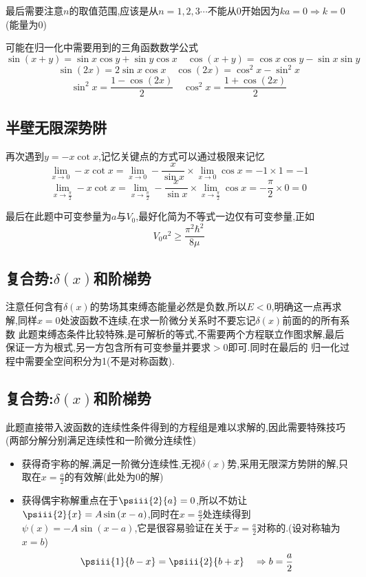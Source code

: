         最后需要注意$n$的取值范围,应该是从$n=1,2,3\cdots$不能从0开始因为$ka=0 \Rightarrow k=0$(能量为0)
        
        可能在归一化中需要用到的三角函数数学公式
        $$\sin(x+y)=\sin{x} \cos{y}+\sin{y}\cos{x} \quad \cos(x+y)=\cos{x} \cos{y} - \sin{x}\sin{y}$$ 
        $$\sin(2x) = 2\sin{x} \cos{x} \quad \cos(2x) = \cos^{2}{x} - \sin^{2}{x} $$
        $$\sin^{2}{x}=\frac{1-\cos(2x)}{2} \quad \cos^{2}{x}=\frac{1+\cos(2x)}{2} $$

    \subsection{半壁无限深势阱}
        再次遇到$y=-x \cot{x}$,记忆关键点的方式可以通过极限来记忆
        $$\lim_{x \to 0}- x \cot{x} = \lim_{x \to 0} -\frac{x}{\sin{x}} \times \lim_{x \to 0}\cos{x} = -1 \times 1 = -1  $$
        $$\lim_{x \to \frac{\pi}{2}}- x \cot{x} = \lim_{x \to \frac{\pi}{2}} -\frac{x}{\sin{x}} \times \lim_{x \to \frac{\pi}{2}}\cos{x} = -\frac{\pi}{2} \times 0 = 0  $$
        
        最后在此题中可变参量为$a$与$V_{0}$,最好化简为不等式一边仅有可变参量,正如
        $$V_{0}a^{2}\geq \frac{\pi^{2}\hbar^{2}}{8 \mu} $$

    \subsection{复合势:\texorpdfstring{$\delta(x)$}{}和阶梯势}
        注意任何含有$\delta(x)$的势场其束缚态能量必然是负数,所以$E<0$,明确这一点再求解,同样$x=0$处波函数不连续,在求一阶微分关系时不要忘记$\delta(x)$前面的的所有系数
        此题束缚态条件比较特殊,是可解析的等式,不需要两个方程联立作图求解,最后保证一方为根式,另一方包含所有可变参量并要求$>0$即可.同时在最后的
        归一化过程中需要全空间积分为1(不是对称函数).

    \subsection{复合势:\texorpdfstring{$\delta(x)$}{}和阶梯势}
        此题直接带入波函数的连续性条件得到的方程组是难以求解的,因此需要特殊技巧(两部分解分别满足连续性和一阶微分连续性)
        \begin{itemize}
            \item 获得奇宇称的解,满足一阶微分连续性,无视$\delta(x)$势,采用无限深方势阱的解,只取在$x=\frac{a}{2}$的有效解(此处为0的解)
            \item 获得偶宇称解重点在于$\psiii{2}{a}=0$,所以不妨让$\psiii{2}{x}=A \sin{(x-a)}$,同时在$x=\frac{a}{2}$处连续得到$\psi(x)=-A \sin{(x-a)}$,它是很容易验证在关于$x=\frac{a}{2}$对称的.(设对称轴为$x=b$)
                $$\psiii{1}{b-x}=\psiii{2}{b+x} \quad \Rightarrow b=\frac{a}{2}$$
        \end{itemize}


